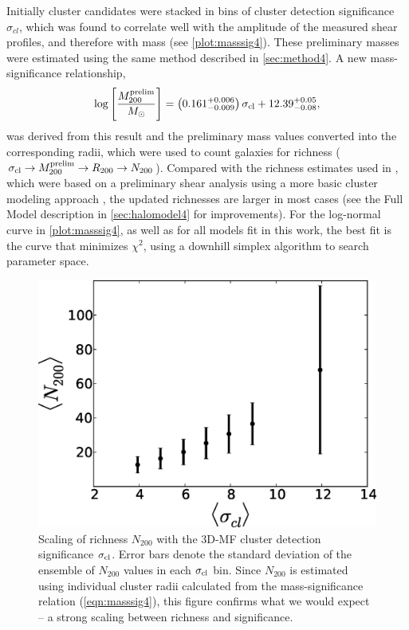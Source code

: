 Initially cluster candidates were stacked in bins of cluster detection significance $\sigma_{cl}$, which was found to correlate well with the amplitude of the measured shear profiles, and therefore with mass (see \autoref{plot:masssig4}). These preliminary masses were estimated using the same method described in \autoref{sec:method4}. A new mass-significance relationship,
\begin{equation}
\label{eqn:masssig4}
\mathrm{log}\left[ \frac{M_{200}^{\rm prelim}}{M_{\odot}} \right] = \left( 0.161^{+0.006}_{-0.009} \right) \sigma_{\rm cl} + 12.39^{+0.05}_{-0.08},
\end{equation}
was derived from this result and the preliminary mass values converted into the corresponding radii, which were used to count galaxies for richness ($\sigma_{\rm cl} \rightarrow M_{200}^{\rm prelim} \rightarrow R_{200} \rightarrow N_{200}$). Compared with the richness estimates used in \citet{Ford14}, which were based on a preliminary shear analysis using a more basic cluster modeling approach \citep{MMthesis11}, the updated richnesses are larger in most cases (see the Full Model description in \autoref{sec:halomodel4} for improvements). For the log-normal curve in \autoref{plot:masssig4}, as well as for all models fit in this work, the best fit is the curve that minimizes $\chi^2$, using a downhill simplex algorithm to search parameter space.

\begin{figure}
\begin{center}
\vspace{0.2cm}
  \includegraphics[scale=0.7]{plots_ch4/N200vsSig.eps}
  \caption[Richness-Significance Scaling]{Scaling of richness $N_{200}$ with the \ac{3D-MF} cluster detection significance $\sigma_{\rm cl}$. Error bars denote the standard deviation of the ensemble of $N_{200}$ values in each $\sigma_{\rm cl}$ bin. Since $N_{200}$ is estimated using individual cluster radii calculated from the mass-significance relation (\autoref{eqn:masssig4}), this figure confirms what we would expect -- a strong scaling between richness and significance.}
\label{plot:n200sig4} %
\end{center}
\end{figure}

